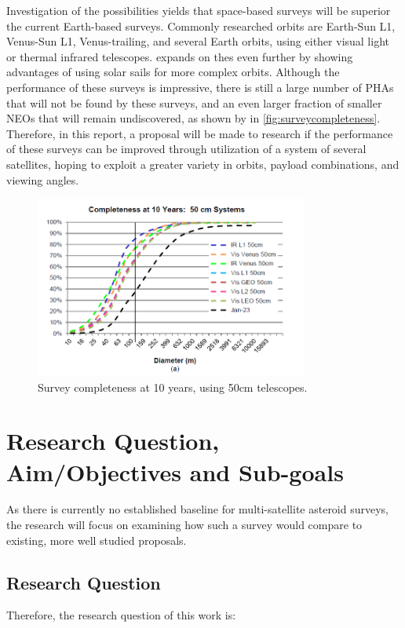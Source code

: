 \documentclass[12pt, english, NoHyper]{AE4010-template}
\begin{document}
Investigation of the possibilities yields that space-based surveys will be superior the current Earth-based surveys. Commonly researched orbits are Earth-Sun L1, Venus-Sun L1, Venus-trailing, and several Earth orbits, using either visual light or thermal infrared telescopes. \cite{ThesisOlga} expands on thes even further by showing advantages of using solar sails for more complex orbits. Although the performance of these surveys is impressive, there is still a large number of PHAs that will not be found by these surveys, and an even larger fraction of smaller NEOs that will remain undiscovered, as shown by \cite{NEOSDT2} in \autoref{fig:surveycompleteness}. Therefore, in this report, a proposal will be made to research if the performance of these surveys can be improved through utilization of a system of several satellites, hoping to exploit a greater variety in orbits, payload combinations, and viewing angles.

\begin{figure}[thb]
 \centering
 \includegraphics[width=0.8\textwidth]{figures/surveycompleteness.png}
 \caption{Survey completeness at 10 years, using 50cm telescopes.}
 \label{fig:surveycompleteness}
\end{figure}


\section{Research Question, Aim/Objectives and Sub-goals}
As there is currently no established baseline for multi-satellite asteroid surveys, the research will focus on examining how such a survey would compare to existing, more well studied proposals.

\subsection{Research Question}
Therefore, the research question of this work is:
\end{document}
